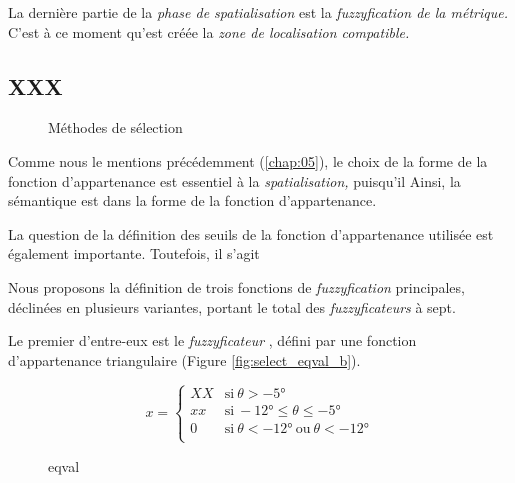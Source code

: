 La dernière partie de la \emph{phase de spatialisation} est la
\emph{fuzzyfication de la métrique.} C'est à ce moment qu'est créée la
\emph{zone de localisation compatible.}

\subsection{XXX}

\begin{figure}
  \centering
  
  \caption{Méthodes de sélection}
  \label{fig:importance_fuzzyfication}
\end{figure}



%
Comme nous le mentions précédemment (\autoref{chap:05}), le choix de la forme de la fonction d'appartenance est essentiel à la \emph{spatialisation,} puisqu'il
%
Ainsi, la sémantique est dans la forme de la fonction d'appartenance.

%
La question de la définition des seuils de la fonction d'appartenance utilisée est également importante. Toutefois, il s'agit 


Nous proposons la définition de trois fonctions de \emph{fuzzyfication} principales, déclinées en plusieurs variantes, portant le total des \emph{fuzzyficateurs} à sept.

Le premier d'entre-eux est le \emph{fuzzyficateur} , défini par une fonction d'appartenance triangulaire (Figure \ref{fig:select_eqval_b}).

\begin{equation}
  \label{eq:eq_val}
  x = \left\{
    \begin{array}{ll}
      XX & \text{si}\ θ > -5° \\
      xx & \text{si}\ -12° ≤ θ ≤ -5° \\
      0 & \text{si}\ θ < -12°\ \text{ou}\ θ < -12°\\
    \end{array}
  \right.
\end{equation}


\begin{figure}
  \centering
  \subfloat[eqval]{
    
    \label{fig:select_eqval_b}
  }
  
  \subfloat[eqval0]{
    
    \label{fig:select_eqval_0}
  }\hfill  
  \subfloat[eqvalangle]{
    
    \label{fig:select_eqval_ang}
  }  
  \caption{eqval}
  \label{fig:select_eqval}
\end{figure}

